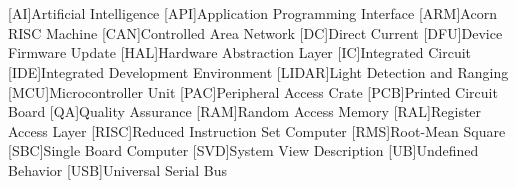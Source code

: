 \cleardoublepage
\chapter*{\listofabbrevname}
{}

\begin{acronym}[KolikMista]

	[AI]{Artificial Intelligence}
	[API]{Application Programming Interface}
	[ARM]{Acorn RISC Machine}
	[CAN]{Controlled Area Network}
	[DC]{Direct Current}
	[DFU]{Device Firmware Update}
	[HAL]{Hardware Abstraction Layer}
	[IC]{Integrated Circuit}
	[IDE]{Integrated Development Environment}
	[LIDAR]{Light Detection and Ranging}
	[MCU]{Microcontroller Unit}
	[PAC]{Peripheral Access Crate}
	[PCB]{Printed Circuit Board}
	[QA]{Quality Assurance}
	[RAM]{Random Access Memory}
	[RAL]{Register Access Layer}
	[RISC]{Reduced Instruction Set Computer}
	[RMS]{Root-Mean Square}
	[SBC]{Single Board Computer}
	[SVD]{System View Description}
	[UB]{Undefined Behavior}
	[USB]{Universal Serial Bus}


\end{acronym}
